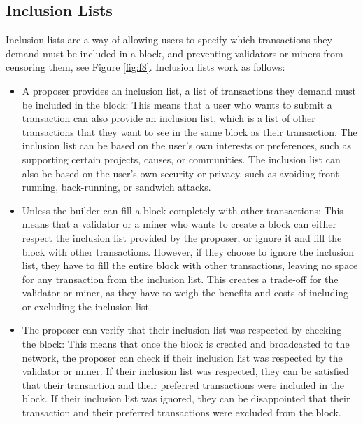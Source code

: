 \documentclass{report}
\begin{document}
\subsection{Inclusion Lists}
Inclusion lists are a way of allowing users to specify which transactions they demand must be included in a block, and preventing validators or miners from censoring them, see Figure \ref{fig:f8}. Inclusion lists work as follows:\\
\begin{itemize}
	\item A proposer provides an inclusion list, a list of transactions they demand must be included in the block: This means that a user who wants to submit a transaction can also provide an inclusion list, which is a list of other transactions that they want to see in the same block as their transaction. The inclusion list can be based on the user’s own interests or preferences, such as supporting certain projects, causes, or communities. The inclusion list can also be based on the user’s own security or privacy, such as avoiding front-running, back-running, or sandwich attacks.
	\item Unless the builder can fill a block completely with other transactions: This means that a validator or a miner who wants to create a block can either respect the inclusion list provided by the proposer, or ignore it and fill the block with other transactions. However, if they choose to ignore the inclusion list, they have to fill the entire block with other transactions, leaving no space for any transaction from the inclusion list. This creates a trade-off for the validator or miner, as they have to weigh the benefits and costs of including or excluding the inclusion list.
	\item The proposer can verify that their inclusion list was respected by checking the block: This means that once the block is created and broadcasted to the network, the proposer can check if their inclusion list was respected by the validator or miner. If their inclusion list was respected, they can be satisfied that their transaction and their preferred transactions were included in the block. If their inclusion list was ignored, they can be disappointed that their transaction and their preferred transactions were excluded from the block.
\end{itemize}
\end{document}
